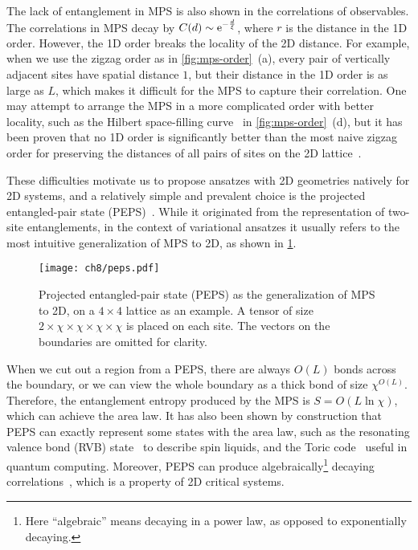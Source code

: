 The lack of entanglement in MPS is also shown in the correlations of observables. The correlations in MPS decay by $C(d) \sim \mathrm{e}^{-\frac{d}{\xi}}$, where $r$ is the distance in the 1D order. However, the 1D order breaks the locality of the 2D distance. For example, when we use the zigzag order as in \cref{fig:mps-order}~(a), every pair of vertically adjacent sites have spatial distance $1$, but their distance in the 1D order is as large as $L$, which makes it difficult for the MPS to capture their correlation. One may attempt to arrange the MPS in a more complicated order with better locality, such as the Hilbert space-filling curve~\cite{hilbert1891uber} in \cref{fig:mps-order}~(d), but it has been proven that no 1D order is significantly better than the most naive zigzag order for preserving the distances of all pairs of sites on the 2D lattice~\cite{xu2012lower}.

These difficulties motivate us to propose ansatzes with 2D geometries natively for 2D systems, and a relatively simple and prevalent choice is the projected entangled-pair state (PEPS)~\cite{verstraete2004renormalization, verstraete2008matrix}. While it originated from the representation of two-site entanglements, in the context of variational ansatzes it usually refers to the most intuitive generalization of MPS to 2D, as shown in \cref{fig:peps}.

\begin{figure}[htb]
\centering
\texttt{[image: ch8/peps.pdf]}
\caption[Projected entangled-pair state (PEPS)]{
Projected entangled-pair state (PEPS) as the generalization of MPS to 2D, on a $4 \times 4$ lattice as an example.
A tensor of size $2 \times \chi \times \chi \times \chi \times \chi$ is placed on each site.
The vectors on the boundaries are omitted for clarity.
}
\label{fig:peps}
\end{figure}

When we cut out a region from a PEPS, there are always $O(L)$ bonds across the boundary, or we can view the whole boundary as a thick bond of size $\chi^{O(L)}$. Therefore, the entanglement entropy produced by the MPS is $S = O(L \ln \chi)$, which can achieve the area law. It has also been shown by construction that PEPS can exactly represent some states with the area law, such as the resonating valence bond (RVB) state~\cite{schuch2012resonating} to describe spin liquids, and the Toric code~\cite{kitaev2003fault, schuch2010peps} useful in quantum computing. Moreover, PEPS can produce algebraically\footnote{Here ``algebraic'' means decaying in a power law, as opposed to exponentially decaying.} decaying correlations~\cite{verstraete2006criticality}, which is a property of 2D critical systems.

